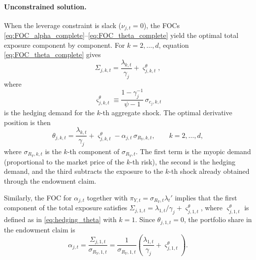 \documentclass[11pt,english]{article}
\begin{document}
\paragraph{Unconstrained solution.}
When the leverage constraint is slack ($\nu_{j,t}=0$), the FOCs \eqref{eq:FOC_alpha_complete}--\eqref{eq:FOC_theta_complete} yield the optimal total exposure component by component. For $k=2,\ldots,d$, equation \eqref{eq:FOC_theta_complete} gives
\begin{equation}\label{eq:Sigma_jk_unconstrained}
    \Sigma_{j,k,t} = \frac{\lambda_{k,t}}{\gamma_j} + \varsigma_{j,k,t}^{\theta},
\end{equation}
where
\begin{equation}\label{eq:hedging_theta}
    \varsigma_{j,k,t}^{\theta} \equiv \frac{1-\gamma_j^{-1}}{\psi-1}\,\sigma_{c_j,k,t}
\end{equation}
is the hedging demand for the $k$-th aggregate shock. The optimal derivative position is then
\begin{equation}\label{eq:theta_jk_optimal}
    \theta_{j,k,t} = \frac{\lambda_{k,t}}{\gamma_j} + \varsigma_{j,k,t}^{\theta} - \alpha_{j,t}\,\sigma_{R_Y,k,t}, \qquad k=2,\ldots,d,
\end{equation}
where $\sigma_{R_Y,k,t}$ is the $k$-th component of $\sigma_{R_Y,t}$. The first term is the myopic demand (proportional to the market price of the $k$-th risk), the second is the hedging demand, and the third subtracts the exposure to the $k$-th shock already obtained through the endowment claim.

Similarly, the FOC for $\alpha_{j,t}$ together with $\pi_{Y,t}=\sigma_{R_Y,t}\lambda_t'$ implies that the first component of the total exposure satisfies $\Sigma_{j,1,t} = \lambda_{1,t}/\gamma_j + \varsigma_{j,1,t}^{\theta}$, where $\varsigma_{j,1,t}^{\theta}$ is defined as in \eqref{eq:hedging_theta} with $k=1$. Since $\theta_{j,1,t}=0$, the portfolio share in the endowment claim is
\begin{equation}\label{eq:alpha_j_complete}
    \alpha_{j,t} = \frac{\Sigma_{j,1,t}}{\sigma_{R_Y,1,t}} = \frac{1}{\sigma_{R_Y,1,t}}\!\left(\frac{\lambda_{1,t}}{\gamma_j} + \varsigma_{j,1,t}^{\theta}\right).
\end{equation}
\end{document}
